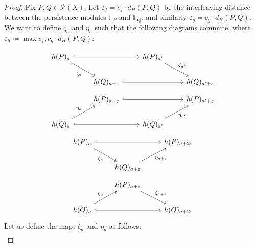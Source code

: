 \begin{proof}
    Fix $P, Q \in \mathcal{P}(X)$.
    Let $\varepsilon_f = c_f \cdot d_H(P, Q)$ be the interleaving distance
    between the persistence modules $\mathbb{F}_P$ and $\mathbb{F}_Q$,
    and similarly $\varepsilon_g = c_g \cdot d_H(P, Q)$.
    We want to define $\zeta_a$ and $\eta_a$ such that the following diagrams
    commute, where $\varepsilon_h \coloneqq \max{c_f, c_g} \cdot d_H(P, Q)$:
    
    \begin{equation}
        \label{eq:minimum_commute_par_1}
        \begin{tikzcd}
            h(P)_a \arrow[hook]{rr} \arrow{dr}[swap]{\zeta_a} & & h(P)_{a'} \arrow{dr}{\zeta_{a'}} \\
            & h(Q)_{a + \varepsilon} \arrow[hook]{rr} & & h(Q)_{a' + \varepsilon}
        \end{tikzcd}
    \end{equation}
    \begin{equation}
        \label{eq:minimum_commute_par_2}
        \begin{tikzcd}
            & h(P)_{a + \varepsilon} \arrow[hook]{rr} & & h(P)_{a' + \varepsilon} \\
            h(Q)_a \arrow[hook]{rr} \arrow{ur}{\eta_a} & & h(Q)_{a'} \arrow{ur}[swap]{\eta_{a'}}
        \end{tikzcd}
    \end{equation}
    \begin{equation}
        \label{eq:minimum_commute_tri_1}
        \begin{tikzcd}
            h(P)_a \arrow{dr}[swap]{\zeta_a} \arrow[hook]{rr} && h(P)_{a + 2\varepsilon} \\
            & h(Q)_{a + \varepsilon} \arrow{ur}[swap]{\eta_{a + \varepsilon}}
        \end{tikzcd}
    \end{equation}
    \begin{equation}
        \label{eq:minimum_commute_tri_2}
        \begin{tikzcd}
            & h(P)_{a + \varepsilon} \arrow{dr}{\zeta_{a + \varepsilon}} \\
            h(Q)_a \arrow{ur}{\eta_a} \arrow[hook]{rr} && h(Q)_{a + 2\varepsilon}
        \end{tikzcd}
    \end{equation}
    Let us define the maps $\zeta_a$ and $\eta_a$ as follows:
    \begin{align}

\end{align}
\end{proof}
